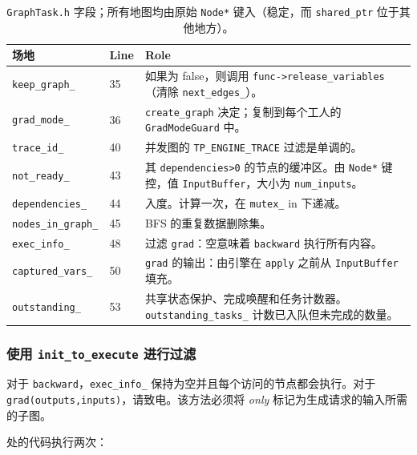 \begin{table}[H]
\centering
\caption{\texttt{GraphTask.h} 字段；所有地图均由原始 \texttt{Node*} 键入（稳定，而 \texttt{shared\_ptr} 位于其他地方）。}
\label{tab:graphtask}
\small
\begin{tabular}{lll}
\toprule
场地 & Line & Role \\
\midrule
\texttt{keep\_graph\_} & 35 & 如果为 false，则调用 \texttt{func->release\_variables}（清除 \texttt{next\_edges\_}）。 \\
\texttt{grad\_mode\_} & 36 & \texttt{create\_graph} 决定；复制到每个工人的 \texttt{GradModeGuard} 中。 \\
\texttt{trace\_id\_} & 40 & 并发图的 \texttt{TP\_ENGINE\_TRACE} 过滤是单调的。 \\
\texttt{not\_ready\_} & 43 & 其 \texttt{dependencies>0} 的节点的缓冲区。由 \texttt{Node*} 键控，值 \texttt{InputBuffer}，大小为 \texttt{num\_inputs}。 \\
\texttt{dependencies\_} & 44 & 入度。计算一次，在 \texttt{mutex\_} in 下递减。 \\
\texttt{nodes\_in\_graph\_} & 45 & BFS 的重复数据删除集。 \\
\texttt{exec\_info\_} & 48 & 过滤 \texttt{grad}：空意味着 \texttt{backward} 执行所有内容。 \\
\texttt{captured\_vars\_} & 50 & \texttt{grad} 的输出：由引擎在 \texttt{apply} 之前从 \texttt{InputBuffer} 填充。 \\
\texttt{outstanding\_} & 53 & 共享状态保护、完成唤醒和任务计数器。 \texttt{outstanding\_tasks\_} 计数已入队但未完成的数量。 \\
\bottomrule
\end{tabular}
\end{table}

\subsubsection{使用 \texttt{init\_to\_execute} 进行过滤}
\label{subsubsec:inittoexec}

对于 \texttt{backward}，\texttt{exec\_info\_} 保持为空并且每个访问的节点都会执行。对于 \texttt{grad(outputs,inputs)}，请致电。该方法必须将 \emph{only} 标记为生成请求的输入所需的子图。

处的代码执行两次：

